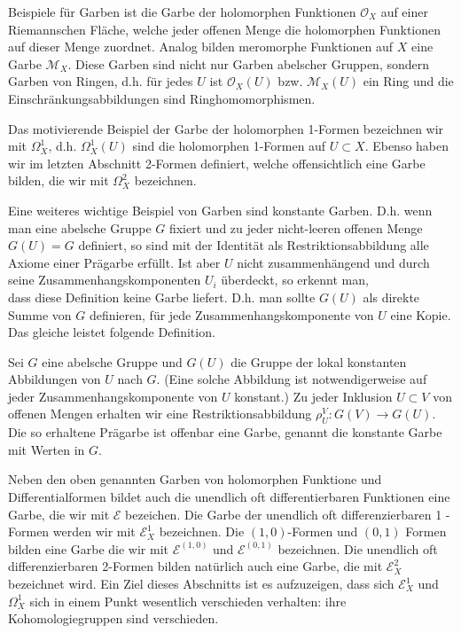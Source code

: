 \documentclass[10pt, letterpaper]{article}
\begin{document}
Beispiele für Garben ist die Garbe der holomorphen Funktionen $\mathcal{O}_{X}$ auf einer Riemannschen Fläche, welche jeder offenen Menge die holomorphen Funktionen auf dieser Menge zuordnet. Analog bilden meromorphe Funktionen auf $X$ eine Garbe $\mathcal{M}_{X}$. Diese Garben sind nicht nur Garben abelscher Gruppen, sondern Garben von Ringen, d.h. für jedes $U$ ist $\mathcal{O}_{X}(U)$ bzw. $\mathcal{M}_{X}(U)$ ein Ring und die Einschränkungsabbildungen sind Ringhomomorphismen.

Das motivierende Beispiel der Garbe der holomorphen 1-Formen bezeichnen wir mit $\Omega_{X}^{1}$, d.h. $\Omega_{X}^{1}(U)$ sind die holomorphen 1-Formen auf $U \subset X$. Ebenso haben wir im letzten Abschnitt 2-Formen definiert, welche offensichtlich eine Garbe bilden, die wir mit $\Omega_{X}^{2}$ bezeichnen.

Eine weiteres wichtige Beispiel von Garben sind konstante Garben. D.h. wenn man eine abelsche Gruppe $G$ fixiert und zu jeder nicht-leeren offenen Menge $G(U)=G$ definiert, so sind mit der Identität als Restriktionsabbildung alle Axiome einer Prägarbe erfüllt. Ist aber $U$ nicht zusammenhängend und durch seine Zusammenhangskomponenten $U_{i}$ überdeckt, so erkennt man,\\
dass diese Definition keine Garbe liefert. D.h. man sollte $G(U)$ als direkte Summe von $G$ definieren, für jede Zusammenhangskomponente von $U$ eine Kopie. Das gleiche leistet folgende Definition.

Sei $G$ eine abelsche Gruppe und $G(U)$ die Gruppe der lokal konstanten Abbildungen von $U$ nach $G$. (Eine solche Abbildung ist notwendigerweise auf jeder Zusammenhangskomponente von $U$ konstant.) Zu jeder Inklusion $U \subset V$ von offenen Mengen erhalten wir eine Restriktionsabbildung $\rho_{U}^{V}: G(V) \rightarrow G(U)$. Die so erhaltene Prägarbe ist offenbar eine Garbe, genannt die konstante Garbe mit Werten in $G$.

Neben den oben genannten Garben von holomorphen Funktione und Differentialformen bildet auch die unendlich oft differentierbaren Funktionen eine Garbe, die wir mit $\mathcal{E}$ bezeichen. Die Garbe der unendlich oft differenzierbaren 1 -Formen werden wir mit $\mathcal{E}_{X}^{1}$ bezeichnen. Die $(1,0)$-Formen und $(0,1)$ Formen bilden eine Garbe die wir mit $\mathcal{E}^{(1,0)}$ und $\mathcal{E}^{(0,1)}$ bezeichnen. Die unendlich oft differenzierbaren 2-Formen bilden natürlich auch eine Garbe, die mit $\mathcal{E}_{X}^{2}$ bezeichnet wird. Ein Ziel dieses Abschnitts ist es aufzuzeigen, dass sich $\mathcal{E}_{X}^{1}$ und $\Omega_{X}^{1}$ sich in einem Punkt wesentlich verschieden verhalten: ihre Kohomologiegruppen sind verschieden.
\end{document}
